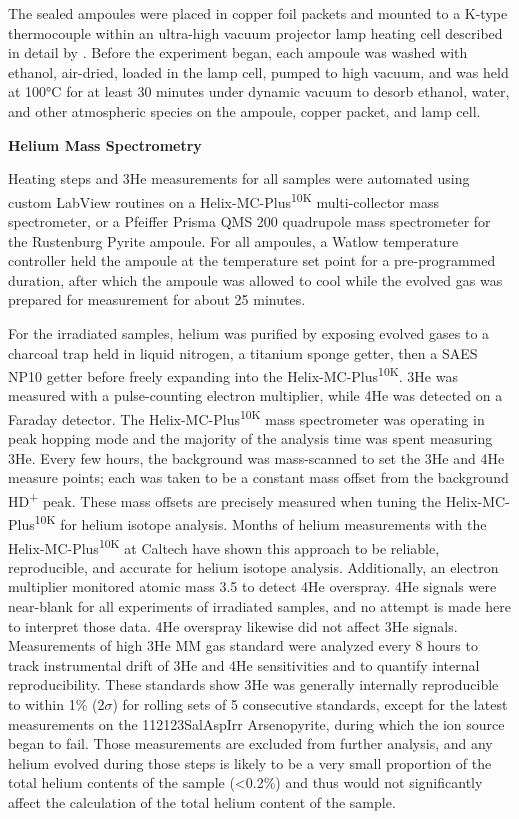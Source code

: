 The sealed ampoules were placed in copper foil packets and mounted to a
K-type thermocouple within an ultra-high vacuum projector lamp heating
cell described in detail by \citet{farley1999}. Before the experiment
began, each ampoule was washed with ethanol, air-dried, loaded in the
lamp cell, pumped to high vacuum, and was held at 100°C for at least 30
minutes under dynamic vacuum to desorb ethanol, water, and other
atmospheric species on the ampoule, copper packet, and lamp cell.

\textbf{Helium Mass Spectrometry}

Heating steps and 3He measurements for all samples were automated using
custom LabView routines on a Helix-MC-Plus\textsuperscript{10K}
multi-collector mass spectrometer, or a Pfeiffer Prisma QMS 200
quadrupole mass spectrometer for the Rustenburg Pyrite ampoule. For all
ampoules, a Watlow temperature controller held the ampoule at the
temperature set point for a pre-programmed duration, after which the
ampoule was allowed to cool while the evolved gas was prepared for
measurement for about 25 minutes.

For the irradiated samples, helium was purified by exposing evolved
gases to a charcoal trap held in liquid nitrogen, a titanium sponge
getter, then a SAES NP10 getter before freely expanding into the
Helix-MC-Plus\textsuperscript{10K}. 3He was measured with a
pulse-counting electron multiplier, while 4He was detected on a Faraday
detector. The Helix-MC-Plus\textsuperscript{10K} mass spectrometer was
operating in peak hopping mode and the majority of the analysis time was
spent measuring 3He. Every few hours, the background was mass-scanned to
set the 3He and 4He measure points; each was taken to be a constant mass
offset from the background HD\textsuperscript{+} peak. These mass
offsets are precisely measured when tuning the
Helix-MC-Plus\textsuperscript{10K} for helium isotope analysis. Months
of helium measurements with the Helix-MC-Plus\textsuperscript{10K} at
Caltech have shown this approach to be reliable, reproducible, and
accurate for helium isotope analysis. Additionally, an electron
multiplier monitored atomic mass 3.5 to detect 4He overspray. 4He
signals were near-blank for all experiments of irradiated samples, and
no attempt is made here to interpret those data. 4He overspray likewise
did not affect 3He signals. Measurements of high 3He MM gas standard
were analyzed every 8 hours to track instrumental drift of 3He and 4He
sensitivities and to quantify internal reproducibility. These standards
show 3He was generally internally reproducible to within 1\% (2$\sigma$) for
rolling sets of 5 consecutive standards, except for the latest
measurements on the 112123SalAspIrr Arsenopyrite, during which the ion
source began to fail. Those measurements are excluded from further
analysis, and any helium evolved during those steps is likely to be a
very small proportion of the total helium contents of the sample
(\textless0.2\%) and thus would not significantly affect the calculation
of the total helium content of the sample.

